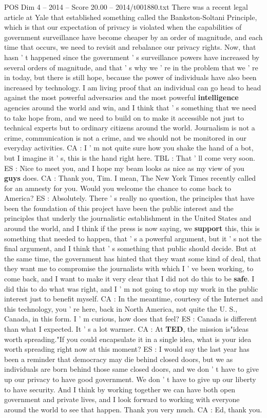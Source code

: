 \begin{textsample}{POS Dim 4 – 2014 – Score 20.00 – 2014/t001880.txt}
There was a recent legal article at Yale that established something called the Bankston-Soltani Principle, which is that our expectation of privacy is violated when the capabilities of government surveillance have become cheaper by an order of magnitude, and each time that occurs, we need to revisit and rebalance our privacy rights.
Now, that hasn ' t happened since the government ' s surveillance powers have increased by several orders of magnitude, and that ' s why we ' re in the problem that we ' re in today, but there is still hope, because the power of individuals have also been increased by technology.
I am living proof that an individual can go head to head against the most powerful adversaries and the most powerful \textbf{intelligence} agencies around the world and win, and I think that ' s something that we need to take hope from, and we need to build on to make it accessible not just to technical experts but to ordinary citizens around the world.
Journalism is not a crime, communication is not a crime, and we should not be monitored in our everyday activities.
CA : I ' m not quite sure how you shake the hand of a bot, but I imagine it ' s, this is the hand right here.
TBL : That ' ll come very soon.
ES : Nice to meet you, and I hope my beam looks as nice as my view of you \textbf{guys} does.
CA : Thank you, Tim.
I mean, The New York Times recently called for an amnesty for you.
Would you welcome the chance to come back to America?
ES : Absolutely.
There ' s really no question, the principles that have been the foundation of this project have been the public interest and the principles that underly the journalistic establishment in the United States and around the world, and I think if the press is now saying, we \textbf{support} this, this is something that needed to happen, that ' s a powerful argument, but it ' s not the final argument, and I think that ' s something that public should decide.
But at the same time, the government has hinted that they want some kind of deal, that they want me to compromise the journalists with which I ' ve been working, to come back, and I want to make it very clear that I did not do this to be \textbf{safe}.
I did this to do what was right, and I ' m not going to stop my work in the public interest just to benefit myself.
CA : In the meantime, courtesy of the Internet and this technology, you ' re here, back in North America, not quite the U.
S., Canada, in this form.
I ' m curious, how does that feel?
ES : Canada is different than what I expected.
It ' s a lot warmer.
CA : At \textbf{TED}, the mission is"ideas worth spreading."If you could encapsulate it in a single idea, what is your idea worth spreading right now at this moment?
ES : I would say the last year has been a reminder that democracy may die behind closed doors, but we as individuals are born behind those same closed doors, and we don ' t have to give up our privacy to have good government.
We don ' t have to give up our liberty to have security.
And I think by working together we can have both open government and private lives, and I look forward to working with everyone around the world to see that happen.
Thank you very much.
CA : Ed, thank you.


\end{textsample}
